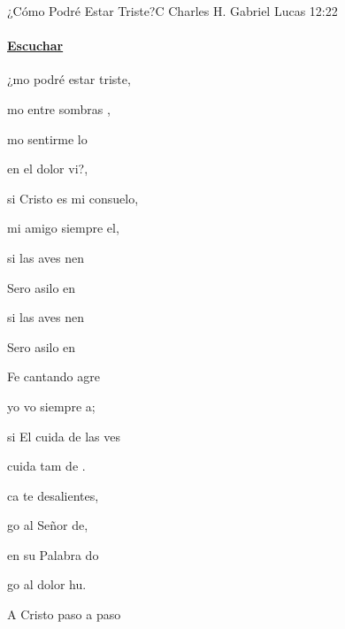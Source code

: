 \documentclass[12pt, spanish]{book}
\newcommand{\NotCCLIed}{\relax}
\begin{document}
    \begin{song}{¿Cómo Podré Estar Triste?}{C}
    {} %
    {Charles H. Gabriel}
    {Lucas 12:22} %
    {} %
        \ifChordBk
        \paragraph{\mbox{}\hfill\protect\href{https://open.spotify.com/intl-es/track/1tCeL7KNEyPaTdow8kpHi0}{Escuchar}\mbox{}\hfill}
        \fi

        \begin{SBOpGroup}
            ¿mo podré estar triste,

            mo entre sombras ,

            mo sentirme lo

             en el dolor vi?,

            si Cristo es mi consuelo,

            mi amigo siempre el,~

            si  las aves nen

            Sero asilo en 

            si  las aves nen

            Sero asilo en 
        \end{SBOpGroup}

        \begin{SBChorus}
            Fe cantando agre

            yo vo siempre a;

            si El cuida de las ves

            cuida tam de .
        \end{SBChorus}

        \begin{SBOpGroup}
            ca te desalientes,

            go al Señor de,

             en su Palabra do

            go al dolor hu.

            A Cristo paso a paso


\end{SBOpGroup}
\end{song}
\end{document}
